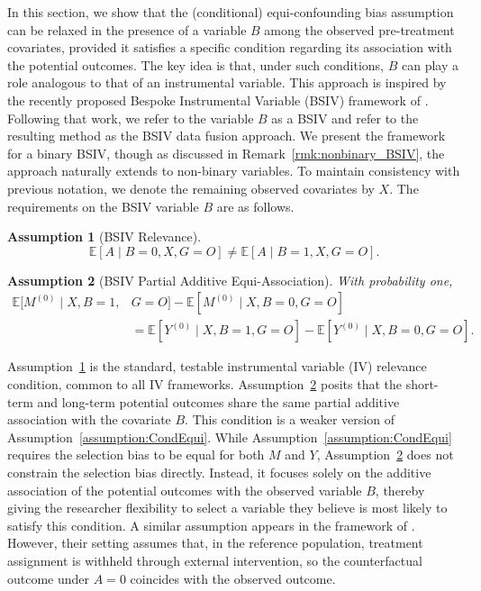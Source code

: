 \documentclass[10pt]{article}
\newtheorem{assumption}{Assumption}
\newcommand{\E}{\mathbb{E}}
\begin{document}
In this section, we show that the (conditional) equi-confounding bias assumption can be relaxed in the presence of a variable \( B \) among the observed pre-treatment covariates, provided it satisfies a specific condition regarding its association with the potential outcomes. The key idea is that, under such conditions, \( B \) can play a role analogous to that of an instrumental variable. This approach is inspired by the recently proposed Bespoke Instrumental Variable (BSIV) framework of \cite{richardson2022bespoke}. Following that work, we refer to the variable \( B \) as a BSIV and refer to the resulting method as the BSIV data fusion approach. We present the framework for a binary BSIV, though as discussed in Remark~\ref{rmk:nonbinary_BSIV}, the approach naturally extends to non-binary variables. To maintain consistency with previous notation, we denote the remaining observed covariates by \( X \). The requirements on the BSIV variable \( B \) are as follows.
\begin{assumption}[BSIV Relevance]
\label{assumption:BSIVrelevance}
\[
\E[A \mid B=0, X, G=O] \neq \E[A \mid B=1, X, G=O].
\]
\end{assumption}
\begin{assumption}[BSIV Partial Additive Equi-Association]
\label{assumption:BSEqui}
With probability one,
\begin{align*}
\E[M^{(0)}\mid X,B=1,&G=O]-\E[M^{(0)}\mid  X,B=0,G=O]\\
&=\E[Y^{(0)}\mid  X,B=1,G=O]-\E[Y^{(0)}\mid  X,B=0,G=O].
\end{align*}	
\end{assumption}
Assumption~\ref{assumption:BSIVrelevance} is the standard, testable instrumental variable (IV) relevance condition, common to all IV frameworks. Assumption~\ref{assumption:BSEqui} posits that the short-term and long-term potential outcomes share the same partial additive association with the covariate \( B \). This condition is a weaker version of Assumption~\ref{assumption:CondEqui}. While Assumption~\ref{assumption:CondEqui} requires the selection bias to be equal for both \( M \) and \( Y \), Assumption~\ref{assumption:BSEqui} does not constrain the selection bias directly. Instead, it focuses solely on the additive association of the potential outcomes with the observed variable \( B \), thereby giving the researcher flexibility to select a variable they believe is most likely to satisfy this condition. A similar assumption appears in the framework of \cite{richardson2022bespoke}. However, their setting assumes that, in the reference population, treatment assignment is withheld through external intervention, so the counterfactual outcome under \( A = 0 \) coincides with the observed outcome.
\end{document}
